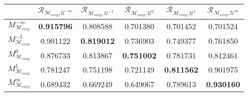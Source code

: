 \begin{tabular}{|l|c|c|c|c|c|}
\toprule
\hline
 & $\mathcal{R}_{\mathcal{M}_{easy}, \mathcal{U}^{-\infty}}$ & $\mathcal{R}_{\mathcal{M}_{easy}, \mathcal{U}^{-1}}$ & $\mathcal{R}_{\mathcal{M}_{easy}, \mathcal{U}^{0}}$ & $\mathcal{R}_{\mathcal{M}_{easy}, \mathcal{U}^{1}}$ & $\mathcal{R}_{\mathcal{M}_{easy}, \mathcal{U}^{\infty}}$ \\
\hline
\midrule
$M^{-\infty}_{\mathcal{M}_{easy}}$ & \textbf{0.915796} & 0.808588 & 0.701380 & 0.701452 & 0.701524 \\
$M^{-1}_{\mathcal{M}_{easy}}$ & 0.901122 & \textbf{0.819012} & 0.736903 & 0.749377 & 0.761850 \\
$M^{0}_{\mathcal{M}_{easy}}$ & 0.876733 & 0.813867 & \textbf{0.751002} & 0.781731 & 0.812461 \\
$M^{1}_{\mathcal{M}_{easy}}$ & 0.781247 & 0.751198 & 0.721149 & \textbf{0.811562} & 0.901975 \\
$M^{\infty}_{\mathcal{M}_{easy}}$ & 0.689432 & 0.669249 & 0.649067 & 0.789613 & \textbf{0.930160} \\
\hline
\bottomrule
\end{tabular}

